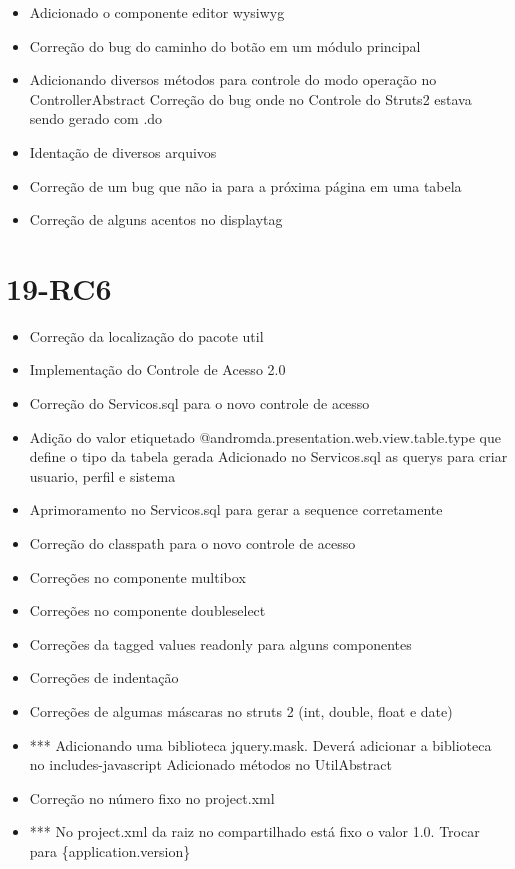 \begin{itemize}
  \item Adicionado o componente editor wysiwyg 
  \item Correção do bug do caminho do botão em um módulo principal
  \item Adicionando diversos métodos para controle do modo operação no
ControllerAbstract Correção do bug onde no Controle do Struts2 estava sendo gerado com .do 
  \item Identação de diversos arquivos
  \item Correção de um bug que não ia para a próxima página em uma tabela
  \item Correção de alguns acentos no displaytag 
\end{itemize}

\section{19-RC6}

\begin{itemize}
  \item Correção da localização do pacote util
  \item Implementação do Controle de Acesso 2.0
  \item Correção do Servicos.sql para o novo controle de acesso
  \item Adição do valor etiquetado @andromda.presentation.web.view.table.type
que define o tipo da tabela gerada Adicionado no Servicos.sql as querys para criar usuario, perfil e sistema 
  \item Aprimoramento no Servicos.sql para gerar a sequence corretamente
  \item Correção do classpath para o novo controle de acesso
  \item Correções no componente multibox
  \item Correções no componente doubleselect 
  \item Correções da tagged values readonly para alguns componentes
  \item Correções de indentação
  \item Correções de algumas máscaras no struts 2 (int, double, float e date)
  \item *** Adicionando uma biblioteca jquery.mask. Deverá adicionar a
biblioteca no includes-javascript Adicionado métodos no UtilAbstract
  \item Correção no número fixo no project.xml
  \item *** No project.xml da raiz no compartilhado está fixo o valor 1.0.
Trocar para \textdollar{}\{application.version\}
\end{itemize}

